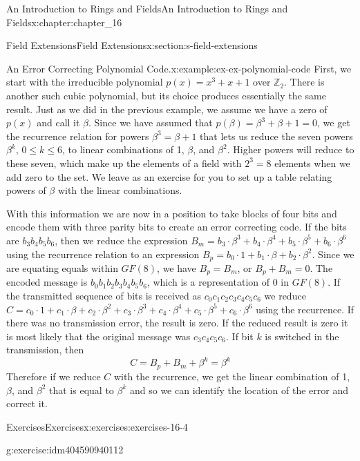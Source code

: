 \documentclass[twoside,10pt,]{book}
\numberwithin{equation}{section}
\begin{document}
\begin{chapterptx}{An Introduction to Rings and Fields}{}{An Introduction to Rings and Fields}{}{}{x:chapter:chapter_16}
\begin{sectionptx}{Field Extensions}{}{Field Extensions}{}{}{x:section:s-field-extensions}
\begin{example}{An Error Correcting Polynomial Code.}{x:example:ex-ex-polynomial-code}
First, we start with the irreducible polynomial \(p(x)=x^3 + x + 1\) over \(\mathbb{Z}_2\). There is another such cubic polynomial, but its choice produces essentially the same result.    Just as we did in the previous example, we assume we have a zero of \(p(x)\) and call it  \(\beta\).  Since we have assumed that \(p(\beta)= \beta^3+\beta + 1=0\), we get the recurrence relation for powers \(\beta^3=\beta + 1\) that lets us reduce the seven powers \(\beta^k\), \(0 \leq k \leq 6\), to  linear combinations of 1, \(\beta\), and \(\beta^2\). Higher powers will reduce to these seven, which make up the elements of a field with \(2^3=8\) elements when we add zero to the set.   We leave as an exercise for you to set up a table relating powers of \(\beta\) with the linear combinations.%
\par
With this information we are now in a position to take blocks of four bits and encode them with three parity bits to create an error correcting code.   If the bits are \(b_3b_4b_5b_6\), then we reduce the expression \(B_m= b_3\cdot \beta^3 +b_4\cdot \beta^4 +b_5\cdot \beta^5 +b_6\cdot \beta^6\) using the recurrence relation to an expression \(B_p=b_0\cdot 1 +b_1\cdot \beta +b_2\cdot \beta^2\).   Since we are equating equals within \(GF(8)\), we have \(B_p=B_m\), or \(B_p+B_m=0\).  The encoded message is \(b_0b_1b_2b_3b_4b_5b_6\), which is a representation of 0 in \(GF(8)\).  If the transmitted sequence of bits is received as \(c_0c_1c_2c_3c_4c_5c_6\) we reduce \(C=c_0\cdot 1 +c_1\cdot \beta +c_2\cdot \beta^2 +c_3\cdot \beta^3 +c_4\cdot \beta^4 +c_5\cdot \beta^5 +c_6\cdot \beta^6\) using the recurrence.   If there was no transmission error, the result is zero.  If the reduced result is zero it is most likely that the original message was \(c_3c_4c_5c_6\).  If  bit \(k\) is switched in the transmission, then%
\begin{equation*}
C = B_p+B_m+ \beta^k= \beta^k
\end{equation*}
Therefore if we reduce \(C\) with the recurrence, we get the linear combination of  1, \(\beta\), and \(\beta^2\) that is equal to \(\beta^k\) and so we can identify the location of the error and correct it.%
\end{example}
%
%
\typeout{************************************************}
\typeout{************************************************}
%
\begin{exercises-subsection}{Exercises}{}{Exercises}{}{}{x:exercises:exercises-16-4}
\begin{divisionexercise}{1}{}{}{g:exercise:idm404590940112}%

\end{divisionexercise}
\end{exercises-subsection}
\end{sectionptx}
\end{chapterptx}
\end{document}
